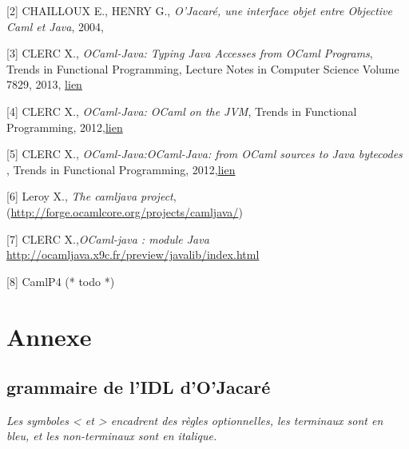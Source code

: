 \documentclass[a4paper, 11pt]{article}
\begin{document}
[2] CHAILLOUX E., HENRY G., \emph{O’Jacaré, une interface objet
  entre Objective Caml et Java}, 2004,

[3] CLERC X., \emph{OCaml-Java: Typing Java Accesses from OCaml
  Programs}, Trends in Functional Programming, Lecture Notes in
Computer Science Volume 7829,
2013, \href{http://www.cs.ru.nl/P.Achten/IFL2013/symposium_proceedings_IFL2013/ifl2013_submission_17.pdf}{lien}

[4] CLERC X., \emph{OCaml-Java: OCaml on the JVM}, Trends in
Functional Programming,
2012,\href{}{lien}

[5] CLERC X., \emph{OCaml-Java:OCaml-Java: from OCaml sources to Java bytecodes }, Trends in Functional Programming, 2012,\href{http://www.lexifi.com/ml2012/full9.pdf}{lien}

[6] Leroy X., \emph{The camljava project},
(\url{http://forge.ocamlcore.org/projects/camljava/})

[7] CLERC X.,\emph{OCaml-java : module Java} \url{http://ocamljava.x9c.fr/preview/javalib/index.html}

[8] CamlP4 (* todo *)












\newpage
\section*{Annexe}


\subsection{grammaire de l'IDL d'O'Jacaré}\label{BNF_IDL}

\emph{Les symboles < et > encadrent des règles optionnelles,
les terminaux sont en bleu, et les non-terminaux sont en italique.}
\end{document}

